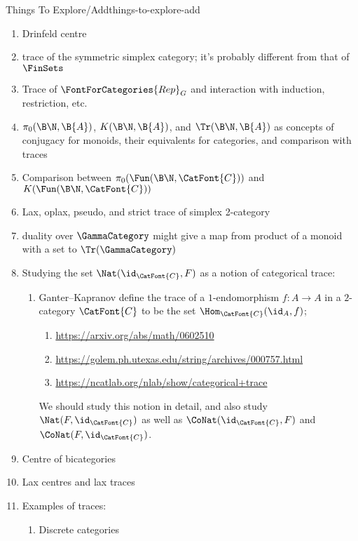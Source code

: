 \begin{remark}{Things To Explore/Add}{things-to-explore-add}
\begin{enumerate}
            Show also that if $c\in[1_{A}]$, then $c$ is idempotent.
        \item Drinfeld centre
        \item trace of the symmetric simplex category; it's probably different from that of $\FinSets$
        \item Trace of $\FontForCategories{Rep}_{G}$ and interaction with induction, restriction, etc.
        \item $\pi_{0}(\B\N,\B{A})$, $K(\B\N,\B{A})$, and $\Tr(\B\N,\B{A})$ as concepts of conjugacy for monoids, their equivalents for categories, and comparison with traces
        \item Comparison between $\pi_{0}(\Fun(\B\N,\CatFont{C}))$ and $K(\Fun(\B\N,\CatFont{C}))$
        \item Lax, oplax, pseudo, and strict trace of simplex 2-category
        \item duality over $\GammaCategory$ might give a map from product of a monoid with a set to $\Tr(\GammaCategory)$
        \item Studying the set $\Nat(\id_{\CatFont{C}},F)$ as a notion of categorical trace:
            \begin{enumerate}
                \item Ganter–Kapranov define the trace of a $1$-endomorphism $f\colon A\to A$ in a $2$-category $\CatFont{C}$ to be the set $\Hom_{\CatFont{C}}(\id_{A},f)$;
                    \begin{enumerate}
                        \item \url{https://arxiv.org/abs/math/0602510}
                        \item \url{https://golem.ph.utexas.edu/string/archives/000757.html}
                        \item \url{https://ncatlab.org/nlab/show/categorical+trace}
                    \end{enumerate}
                    We should study this notion in detail, and also study $\Nat(F,\id_{\CatFont{C}})$ as well as $\CoNat(\id_{\CatFont{C}},F)$ and $\CoNat(F,\id_{\CatFont{C}})$.
            \end{enumerate}
        \item Centre of bicategories
        \item Lax centres and lax traces
        \item Examples of traces:
            \begin{enumerate}
                \item Discrete categories

\end{enumerate}
\end{enumerate}
\end{remark}

